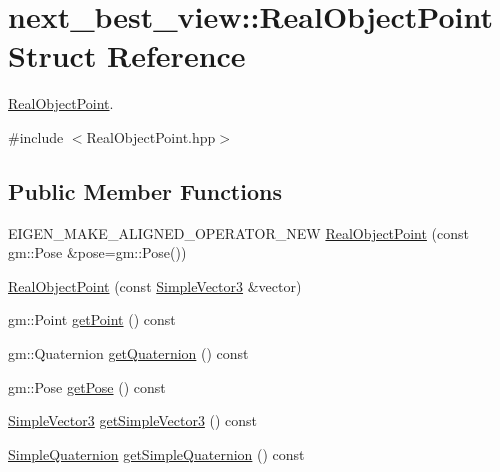 \hypertarget{structnext__best__view_1_1RealObjectPoint}{\section{next\-\_\-best\-\_\-view\-:\-:\-Real\-Object\-Point \-Struct \-Reference}
\label{structnext__best__view_1_1RealObjectPoint}
}


\hyperlink{structnext__best__view_1_1RealObjectPoint}{\-Real\-Object\-Point}.  




{\ttfamily \#include $<$\-Real\-Object\-Point.\-hpp$>$}

\subsection*{\-Public \-Member \-Functions}
\begin{DoxyCompactItemize}
\item 
\-E\-I\-G\-E\-N\-\_\-\-M\-A\-K\-E\-\_\-\-A\-L\-I\-G\-N\-E\-D\-\_\-\-O\-P\-E\-R\-A\-T\-O\-R\-\_\-\-N\-E\-W \hyperlink{structnext__best__view_1_1RealObjectPoint_ac94c89c19cc7723978c5f0bab23bf84a}{\-Real\-Object\-Point} (const gm\-::\-Pose \&pose=gm\-::\-Pose())
\item 
\hyperlink{structnext__best__view_1_1RealObjectPoint_a82b4e7ad2268784a5963a56d044bab16}{\-Real\-Object\-Point} (const \hyperlink{namespacenext__best__view_a59fc75b908e198bc02a9b19ba88edf12}{\-Simple\-Vector3} \&vector)
\item 
gm\-::\-Point \hyperlink{structnext__best__view_1_1RealObjectPoint_afd67efbb1ea72c0110fb08185a6ce3e8}{get\-Point} () const 
\item 
gm\-::\-Quaternion \hyperlink{structnext__best__view_1_1RealObjectPoint_a91fa24c1b1ba97c08f776a8a9a029df9}{get\-Quaternion} () const 
\item 
gm\-::\-Pose \hyperlink{structnext__best__view_1_1RealObjectPoint_a298bf46d426e6f63e5a1e1f52186e9c7}{get\-Pose} () const 
\item 
\hyperlink{namespacenext__best__view_a59fc75b908e198bc02a9b19ba88edf12}{\-Simple\-Vector3} \hyperlink{structnext__best__view_1_1RealObjectPoint_af216c5e59424a010490b826c68cd86c4}{get\-Simple\-Vector3} () const 
\item 
\hyperlink{namespacenext__best__view_a165f1f159539ff8e583fb7fe3620390c}{\-Simple\-Quaternion} \hyperlink{structnext__best__view_1_1RealObjectPoint_ae1d98ba7b3f06891aaf14979e0cfff21}{get\-Simple\-Quaternion} () const 
\end{DoxyCompactItemize}
